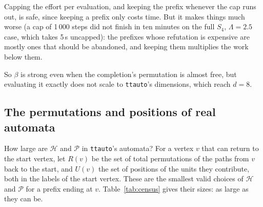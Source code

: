 \documentclass[11pt]{amsart}
\newcommand{\ttauto}{\texttt{ttauto}}
\newcommand{\Lam}{\Lambda}
\newcommand{\Pos}{\mathcal{P}}
\newcommand{\Hgp}{\mathcal{H}}
\theoremstyle{plain}
\theoremstyle{definition}
\begin{document}
Capping the effort per evaluation, and keeping the prefix whenever the cap
runs out, is safe, since keeping a prefix only costs time.  But it makes
things much worse (a cap of 1\,000 steps did not finish in ten minutes on
the full $S_4$, $\Lam=2.5$ case, which takes 5\,s uncapped): the prefixes
whose refutation is expensive are mostly ones that should be abandoned, and
keeping them multiplies the work below them.

So $\beta$ is strong even when the completion's permutation is almost free,
but evaluating it exactly does not scale to \ttauto's dimensions, which
reach $d=8$.

\subsection{The permutations and positions of real automata}

How large are $\Hgp$ and $\Pos$ in \ttauto's automata?  For a vertex $v$
that can return to the start vertex, let $R(v)$ be the set of total
permutations of the paths from $v$ back to the start, and $U(v)$ the set of
positions of the units they contribute, both in the labels of the start
vertex.  These are the smallest valid choices of $\Hgp$ and $\Pos$ for a
prefix ending at $v$.  Table~\ref{tab:census} gives their sizes: as large
as they can be.
\end{document}
